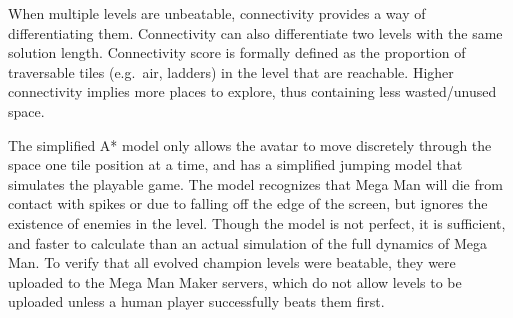 
When multiple levels are unbeatable, connectivity  provides a way of differentiating them. Connectivity can also differentiate two levels with the same solution length. Connectivity score is formally defined as the proportion of traversable tiles (e.g.\ air, ladders) in the level that are reachable.
Higher connectivity implies more places to explore, thus containing less wasted/unused space.


The simplified A* model only allows the avatar to move discretely through the space one tile position at a time, and has a simplified jumping model that simulates the playable game. The model recognizes that Mega Man will die from contact with spikes or due to falling off the edge of the screen, but ignores the existence of enemies in the level. Though the model is not perfect, it is sufficient, and faster to calculate than an actual simulation of the full dynamics of Mega Man. To verify that all evolved champion levels were beatable, they were uploaded to the Mega Man Maker servers, which do not allow levels to be uploaded unless a human player successfully beats them first.


